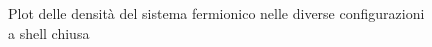 \documentclass[11pt,a4paper]{article}
\begin{document}
\begin{figure}[!h]
\hspace{3mm}
\hspace{3mm}
\caption{Plot delle densità del sistema fermionico nelle diverse configurazioni a shell chiusa}
\end{figure}\ \\
\end{document}
